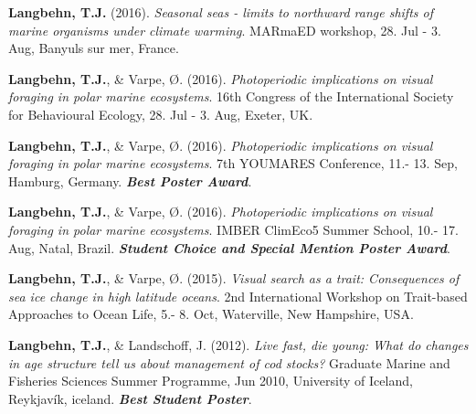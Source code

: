 \documentclass[11pt, a4paper]{awesome-cv}
\begin{document}
\leavevmode\hypertarget{ref-Langbehn3}{}%
\textbf{Langbehn, T.J.} (2016). \emph{Seasonal seas - limits to
northward range shifts of marine organisms under climate warming}.
MARmaED workshop, 28. Jul - 3. Aug, Banyuls sur mer, France.

\leavevmode\hypertarget{ref-Langbehn4}{}%
\textbf{Langbehn, T.J.}, \& Varpe, Ø. (2016). \emph{Photoperiodic
implications on visual foraging in polar marine ecosystems}. 16th
Congress of the International Society for Behavioural Ecology, 28. Jul -
3. Aug, Exeter, UK.

\leavevmode\hypertarget{ref-Langbehn5}{}%
\textbf{Langbehn, T.J.}, \& Varpe, Ø. (2016). \emph{Photoperiodic
implications on visual foraging in polar marine ecosystems}. 7th
YOUMARES Conference, 11.- 13. Sep, Hamburg, Germany. \emph{\textbf{Best
Poster Award}}.

\leavevmode\hypertarget{ref-Langbehn6}{}%
\textbf{Langbehn, T.J.}, \& Varpe, Ø. (2016). \emph{Photoperiodic
implications on visual foraging in polar marine ecosystems}. IMBER
ClimEco5 Summer School, 10.- 17. Aug, Natal, Brazil.
\emph{\textbf{Student Choice and Special Mention Poster Award}}.

\leavevmode\hypertarget{ref-Langbehn2}{}%
\textbf{Langbehn, T.J.}, \& Varpe, Ø. (2015). \emph{Visual search as a
trait: Consequences of sea ice change in high latitude oceans}. 2nd
International Workshop on Trait-based Approaches to Ocean Life, 5.- 8.
Oct, Waterville, New Hampshire, USA.

\leavevmode\hypertarget{ref-Langbehn1}{}%
\textbf{Langbehn, T.J.}, \& Landschoff, J. (2012). \emph{Live fast, die
young: What do changes in age structure tell us about management of cod
stocks?} Graduate Marine and Fisheries Sciences Summer Programme, Jun
2010, University of Iceland, Reykjavík, iceland. \emph{\textbf{Best
Student Poster}}.

\endgroup
\end{document}

